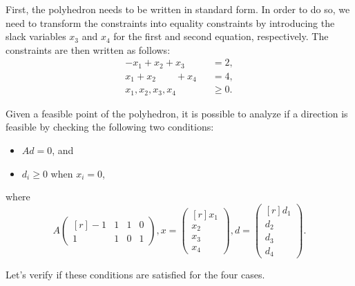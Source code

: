 
    First, the polyhedron needs to be written in standard form. In
    order to do so, we need to transform the constraints into equality
    constraints by introducing the slack variables $x_3$ and $x_4$ for
    the first and second equation, respectively. The constraints are
    then written as follows:
    \begin{align*}
        -x_1 + x_2 + x_3 \qquad & = 2, \\
        x_1 + x_2 \qquad + x_4 & = 4,\\
        x_1, x_2, x_3, x_4 & \geq 0.
    \end{align*}
    
    Given a feasible point of the polyhedron, it is possible to analyze if a direction is feasible by checking the following two conditions:
    \begin{itemize}
        \item $Ad = 0$, and
        \item $d_i \geq 0$ when $x_i = 0$,
    \end{itemize}
    where
    $$A \begin{pmatrix*}[r] -1 & 1 & 1 & 0 \\ 1 & 1 & 0 & 1 \end{pmatrix*}, x = \begin{pmatrix*}[r] x_1 \\ x_2 \\ x_3 \\ x_4 \end{pmatrix*}, d = \begin{pmatrix*}[r] d_1 \\ d_2 \\ d_3 \\ d_4 \end{pmatrix*}.$$
    
    
    Let's verify if these conditions are satisfied for the four cases.
    
